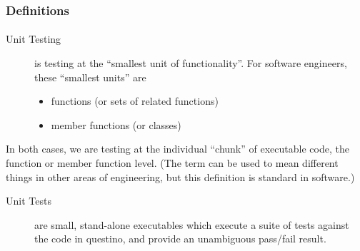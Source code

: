 \begin{frame}[fragile]
\frametitle{Definitions}
\framesubtitle{}
\begin{description}
\item [Unit Testing] is testing at the ``smallest unit of
functionality''.  For software engineers, these 
``smallest units'' are
\begin{itemize}
\item functions (or sets of related functions)
\item member functions (or classes)
\end{itemize}
\end{description}

In both cases, we are testing at the individual ``chunk'' of
executable code, the function or member function level.
\vskip 6pt
(The term can be used to mean different things in other areas of
engineering, but this definition is standard in software.)
\begin{description}
\item [Unit Tests] are small, stand-alone executables which execute a
  suite of tests against the code in questino, and provide an
  unambiguous pass/fail result.
\end{description}
\end{frame}


